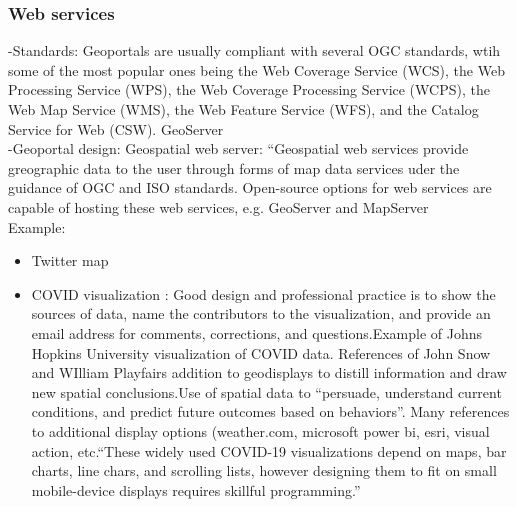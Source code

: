 \subsubsection{Web services}
-{\color{orange}Standards: Geoportals are usually compliant with several OGC standards, wtih some of the most popular ones being the Web Coverage Service (WCS), the Web Processing Service (WPS), the Web Coverage Processing Service (WCPS), the Web Map Service (WMS), the Web Feature Service (WFS), and the Catalog Service for Web (CSW). GeoServer\cite{Jiang2020}}\\
-{\color{orange}Geoportal design: Geospatial web server: ``Geospatial web services provide greographic data to the user through forms of map data services uder the guidance of OGC and ISO standards. Open-source options for web services are capable of hosting these web services, e.g. GeoServer and MapServer \cite{Jiang2020}}\\
Example:
\begin{itemize}
	\item Twitter map \cite{Fisher2014}
	\item COVID visualization \cite{Shneiderman2020}: {Good design and professional practice is to show the sources of data, name the contributors to the visualization, and provide an email address for comments, corrections, and questions.\cite{Shneiderman2020}}{Example of Johns Hopkins University visualization of COVID data}.  {References of John Snow and WIlliam Playfairs addition to geodisplays to distill information and draw new spatial conclusions\cite{Shneiderman2020}}.{\color{orange}Use of spatial data to “persuade, understand current conditions, and predict future outcomes based on behaviors”.\cite{Shneiderman2020}} {Many references to additional display options (weather.com, microsoft power bi, esri, visual action, etc.}{\color{orange}“These widely used COVID-19 visualizations depend on maps, bar charts, line chars, and scrolling lists, however designing them to fit on small mobile-device displays requires skillful programming.”\cite{Shneiderman2020}}  
\end{itemize}

